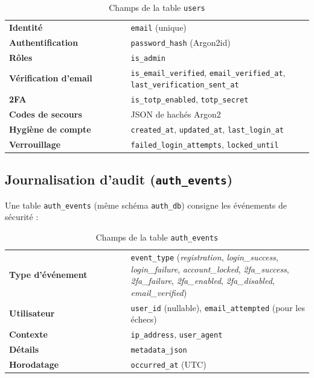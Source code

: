 \begin{table}[H]
\centering
\caption{Champs de la table \texttt{users}}
\label{tab:chap10_users_fields}
\noindent\begin{tabular}{@{}p{0.40\linewidth}p{0.60\linewidth}@{}}
\textbf{Identité} & \texttt{email} (unique) \\
\textbf{Authentification} & \texttt{password\_hash} (Argon2id) \\
\textbf{Rôles} & \texttt{is\_admin} \\
\textbf{Vérification d'email} & \texttt{is\_email\_verified}, \texttt{email\_verified\_at}, \texttt{last\_verification\_sent\_at} \\
\textbf{2FA} & \texttt{is\_totp\_enabled}, \texttt{totp\_secret} \\
\textbf{Codes de secours} & JSON de hachés Argon2 \\
\textbf{Hygiène de compte} & \texttt{created\_at}, \texttt{updated\_at}, \texttt{last\_login\_at} \\
\textbf{Verrouillage} & \texttt{failed\_login\_attempts}, \texttt{locked\_until} \\
\end{tabular}
\end{table}


\subsection*{Journalisation d'audit (\texttt{auth\_events})}
\noindent Une table \texttt{auth\_events} (même schéma \texttt{auth\_db}) consigne les événements de sécurité :

\begin{table}[H]
\centering
\caption{Champs de la table \texttt{auth\_events}}
\label{tab:chap10_auth_events_fields}
\noindent\begin{tabular}{@{}p{0.40\linewidth}p{0.60\linewidth}@{}}
\textbf{Type d'événement} & \texttt{event\_type} (\textit{registration}, \textit{login\_success}, \textit{login\_failure}, \textit{account\_locked}, \textit{2fa\_success}, \textit{2fa\_failure}, \textit{2fa\_enabled}, \textit{2fa\_disabled}, \textit{email\_verified}) \\
\textbf{Utilisateur} & \texttt{user\_id} (nullable), \texttt{email\_attempted} (pour les échecs) \\
\textbf{Contexte} & \texttt{ip\_address}, \texttt{user\_agent} \\
\textbf{Détails} & \texttt{metadata\_json} \\
\textbf{Horodatage} & \texttt{occurred\_at} (UTC) \\
\end{tabular}
\end{table}

